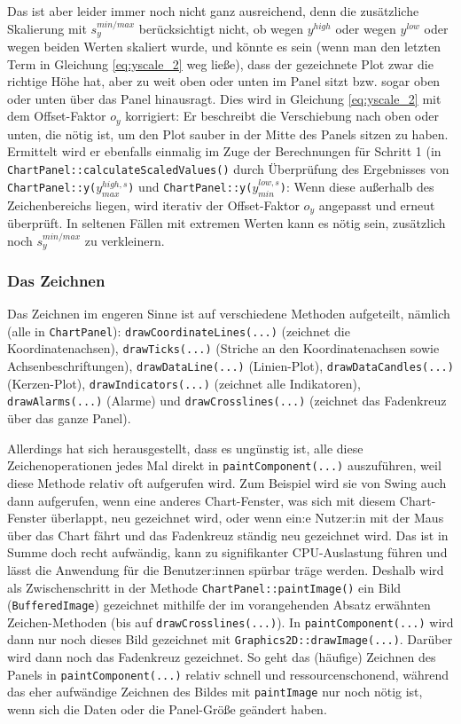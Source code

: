 \documentclass[fontsize=12pt, paper=a4, pagesize=auto, twoside=false, DIV=11, draft=false]{scrartcl}
\begin{document}
Das ist aber leider immer noch nicht ganz ausreichend, denn die zusätzliche Skalierung mit $s_y^{min/max}$ berücksichtigt nicht, ob wegen $y^{high}$ oder wegen $y^{low}$ oder wegen beiden Werten skaliert wurde, und könnte es sein (wenn man den letzten Term in Gleichung \eqref{eq:yscale_2} weg ließe), dass der gezeichnete Plot zwar die richtige Höhe hat, aber zu weit oben oder unten im Panel sitzt bzw. sogar oben oder unten über das Panel hinausragt. Dies wird in Gleichung \eqref{eq:yscale_2} mit dem Offset-Faktor $o_y$ korrigiert: Er beschreibt die Verschiebung nach oben oder unten, die nötig ist, um den Plot sauber in der Mitte des Panels sitzen zu haben. Ermittelt wird er ebenfalls einmalig im Zuge der Berechnungen für Schritt 1 (in \texttt{Chart\-Panel::cal\-cu\-late\-Scaled\-Values()} durch Überprüfung des Ergebnisses von \texttt{ChartPanel::y($y^{high,s}_{max}$)} und \texttt{ChartPanel::y($y^{low,s}_{min}$)}: Wenn diese außerhalb des Zeichenbereichs liegen, wird iterativ der Offset-Faktor $o_y$ angepasst und erneut überprüft. In seltenen Fällen mit extremen Werten kann es nötig sein, zusätzlich noch $s_y^{min/max}$ zu verkleinern.

\subsubsection{Das Zeichnen}
Das Zeichnen im engeren Sinne ist auf verschiedene Methoden aufgeteilt, nämlich (alle in \texttt{ChartPanel}): \texttt{drawCoordinateLines(...)} (zeichnet die Koordinatenachsen), \texttt{drawTicks(...)} (Striche an den Koordinatenachsen sowie Achsenbeschriftungen), \texttt{drawDataLine(...)} (Linien-Plot), \texttt{drawDataCandles(...)} (Kerzen-Plot), \texttt{draw\-In\-di\-ca\-tors(...)} (zeichnet alle Indikatoren), \texttt{drawAlarms(...)} (Alarme) und \texttt{draw\-Cross\-lines(...)} (zeichnet das Fadenkreuz über das ganze Panel). 

Allerdings hat sich herausgestellt, dass es ungünstig ist, alle diese Zeichenoperationen jedes Mal direkt in \texttt{paintComponent(...)} auszuführen, weil diese Methode relativ oft aufgerufen wird. Zum Beispiel wird sie von Swing auch dann aufgerufen, wenn eine anderes Chart-Fenster, was sich mit diesem Chart-Fenster überlappt, neu gezeichnet wird, oder wenn ein:e Nutzer:in mit der Maus über das Chart fährt und das Fadenkreuz ständig neu gezeichnet wird. Das ist in Summe doch recht aufwändig, kann zu signifikanter CPU-Auslastung führen und lässt die Anwendung für die Benutzer:innen spürbar träge werden. Deshalb wird als Zwischenschritt in der Methode \texttt{ChartPanel::paintImage()} ein Bild (\texttt{BufferedImage}) gezeichnet mithilfe der im vorangehenden Absatz erwähnten Zeichen-Methoden (bis auf \texttt{drawCrosslines(...)}). In \texttt{paintComponent(...)} wird dann nur noch dieses Bild gezeichnet mit \texttt{Graphics2D::drawImage(...)}. Darüber wird dann noch das Fadenkreuz gezeichnet. So geht das (häufige) Zeichnen des Panels in \texttt{paintComponent(...)} relativ schnell und ressourcenschonend, während das eher aufwändige Zeichnen des Bildes mit \texttt{paintImage} nur noch nötig ist, wenn sich die Daten oder die Panel-Größe geändert haben. 
\end{document}
